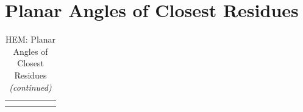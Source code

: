 \documentclass[a4paper, nobind]{templates/ociamthesis}
\begin{document}
\hypertarget{planar-angles-of-closest-residues-1}{%
\section{Planar Angles of Closest Residues}\label{planar-angles-of-closest-residues-1}}

\begin{longtabu} to 
\caption{\label{tab:HEM-t-planarClosest}HEM: Planar Angles of Closest Residues}\\
\toprule
{} &  &  &  &  & \\
\midrule
\endfirsthead
\caption[]{\label{tab:HEM-t-planarClosest}HEM: Planar Angles of Closest Residues \textit{(continued)}}\\
\toprule
{} &  &  &  &  & \\
\midrule
\endhead


\end{longtabu}
\end{document}

